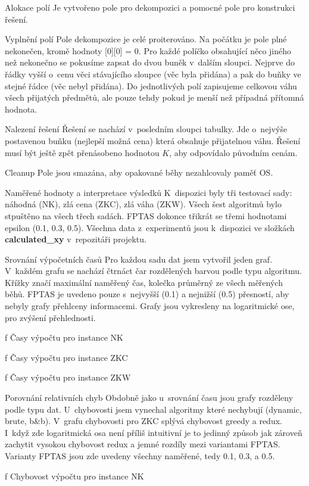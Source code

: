 \secc Alokace polí
Je vytvořeno pole pro dekompozici a pomocné pole pro konstrukci řešení.

\vfill\break


\secc Vyplnění polí
Pole dekompozice je celé proiterováno. Na počátku je pole plné nekonečen, kromě hodnoty [0][0] = 0. Pro každé políčko obsahující něco jiného než nekonečno se pokusíme zapsat do dvou buněk v~dalším sloupci. Nejprve do řádky vyšší o~cenu věci stávajícího sloupce (věc byla přidána) a pak do buňky ve stejné řádce (věc nebyl přidána). Do jednotlivých polí zapisujeme celkovou váhu všech přijatých předmětů, ale pouze tehdy pokud je menší než případná přítomná hodnota.

\secc Nalezení řešení
Řešení se nachází v~posledním sloupci tabulky. Jde o~nejvýše postavenou buňku (nejlepší možná cena) která obsahuje přijatelnou váhu. Řešení musí být ještě zpět přenásobeno hodnotou $K$, aby odpovídalo původním cenám.

\secc Cleanup
Pole jsou smazána, aby opakované běhy nezahlcovaly paměť OS.


\sec Naměřené hodnoty a interpretace výsledků
K~dispozici byly tři testovací sady: náhodná (NK), zlá cena (ZKC), zlá váha (ZKW). Všech šest algoritmů bylo stpuštěno na všech třech sadách. FPTAS dokonce třikrát se třemi hodnotami epsilon (0.1, 0.3, 0.5). Všechna data z~experimentů jsou k~dispozici ve složkách {\bf calculated\_xy} v~repozitáři projektu.


\secc Srovnání výpočetních časů
Pro každou sadu dat jsem vytvořil jeden graf. V~každém grafu se nachází čtrnáct čar rozdělených barvou podle typu algoritmu. Křížky značí maximální naměřený čas, kolečka průměrný ze všech měřených běhů. FPTAS je uvedeno pouze s~nejvyšší (0.1) a nejnižší (0.5) přesností, aby nebyly grafy přehlceny informacemi. Grafy jsou vykresleny na logaritmické ose, pro zvýšení přehlednosti.

\centerline{\picwidth=16cm  }
\caption/f Časy výpočtu pro instance NK

\centerline{\picwidth=16cm  }
\caption/f Časy výpočtu pro instance ZKC

\centerline{\picwidth=16cm  }
\caption/f Časy výpočtu pro instance ZKW


\vfill\break
\secc Porovnání relativních chyb
Obdobně jako u~srovnání času jsou grafy rozděleny podle typu dat. U~chybovosti jsem vynechal algoritmy které nechybují (dynamic, brute, b\&b). V~grafu chybovosti pro ZKC splývá chybovost greedy a redux. I~když zde logaritmická osa není příliš intuitivní je to jedinný způsob jak zároveň zachytit vysokou chybovost redux a jemné rozdíly mezi variantami FPTAS. Varianty FPTAS jsou zde uvedeny všechny naměřené, tedy 0.1, 0.3, a 0.5.
\midinsert
\centerline{\picwidth=14cm  }
\caption/f Chybovost výpočtu pro instance NK

